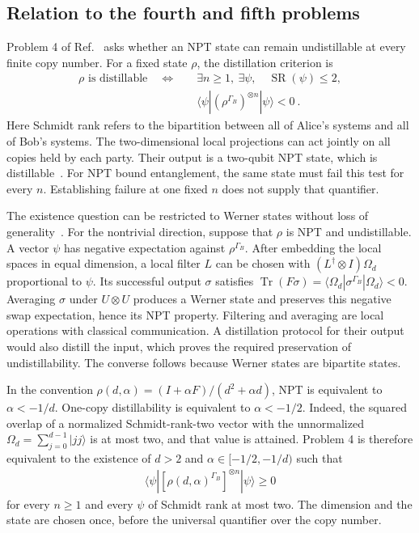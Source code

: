 \documentclass[aps,pra,reprint,superscriptaddress,amsmath,amssymb,floatfix,nofootinbib]{revtex4-2}
\newcommand{\Tr}{\operatorname{Tr}}
\begin{document}
\subsection{Relation to the fourth and fifth problems}
\label{sec:problem-reductions}

Problem 4 of Ref.~\cite{Five} asks whether an NPT state can remain
undistillable at every finite copy number. For a fixed state $\rho$,
the distillation criterion is
\begin{align}
 \rho\text{ is distillable}
 \quad\Longleftrightarrow\quad
 &\exists n\geq1,\ \exists\psi,\quad \operatorname{SR}(\psi)\leq2,
 \nonumber\\[-2pt]
 &\langle\psi|(\rho^{\Gamma_B})^{\otimes n}|\psi\rangle<0\ .
 \label{eq:general-distillation-criterion}
\end{align}
Here Schmidt rank refers to the bipartition between all of Alice's
systems and all of Bob's systems. The two-dimensional local projections
can act jointly on all copies held by each party. Their output is a
two-qubit NPT state, which is distillable~\cite{HHH,DCLB}.
For NPT bound entanglement, the same state must fail this test for
every $n$. Establishing failure at one fixed $n$ does not supply that
quantifier.

The existence question can be restricted to Werner states without loss
of generality~\cite{HHWerner,DCLB,PPHH}.
For the nontrivial direction, suppose that $\rho$ is NPT and
undistillable. A vector $\psi$ has negative expectation against
$\rho^{\Gamma_B}$. After embedding the local spaces in equal dimension,
a local filter $L$ can be chosen with
$(L^\dagger\otimes I)\Omega_d$ proportional to $\psi$.
Its successful output $\sigma$ satisfies
$\Tr(F\sigma)=\langle\Omega_d|\sigma^{\Gamma_B}|\Omega_d\rangle<0$.
Averaging $\sigma$ under $U\otimes U$ produces a Werner state and
preserves this negative swap expectation, hence its NPT property.
Filtering and averaging are local operations with classical
communication. A distillation protocol for their output would also
distill the input, which proves the required preservation of
undistillability. The converse follows because Werner states are
bipartite states.

In the convention
$\rho(d,\alpha)=(I+\alpha F)/(d^2+\alpha d)$, NPT is equivalent to
$\alpha<-1/d$. One-copy distillability is equivalent to $\alpha<-1/2$.
Indeed, the squared overlap of a normalized Schmidt-rank-two vector
with the unnormalized $\Omega_d=\sum_{j=0}^{d-1}|jj\rangle$ is at most
two, and that value is attained. Problem 4 is therefore equivalent to
the existence of $d>2$ and $\alpha\in[-1/2,-1/d)$ such that
\begin{align}
 \langle\psi|[\rho(d,\alpha)^{\Gamma_B}]^{\otimes n}|\psi\rangle
 \geq0
 \label{eq:problem-four-quantifiers}
\end{align}
for every $n\geq1$ and every $\psi$ of Schmidt rank at most two.
The dimension and the state are chosen once, before the universal
quantifier over the copy number.
\end{document}
